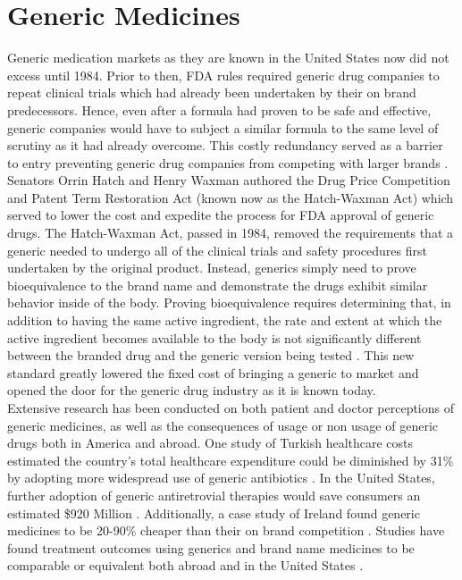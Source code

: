 \section{Generic Medicines}
Generic medication markets as they are known in the United States now did not excess until 1984. Prior to then, FDA rules required generic drug companies to repeat clinical trials which had already been undertaken by their on brand predecessors. Hence, even after a formula had proven to be safe and effective, generic companies would have to subject a similar formula to the same level of scrutiny as it had already overcome. This costly redundancy served as a barrier to entry preventing generic drug companies from competing with larger brands \cite{eban_bottle_2019}.\\
\indent Senators Orrin Hatch and Henry Waxman authored the Drug Price Competition and Patent Term Restoration Act (known now as the Hatch-Waxman Act) which served to lower the cost and expedite the process for FDA approval of generic drugs. The Hatch-Waxman Act, passed in 1984, removed the requirements that a generic needed to undergo all of the clinical trials and safety procedures first undertaken by the original product. Instead, generics simply need to prove bioequivalence to the brand name and demonstrate the drugs exhibit similar behavior inside of the body. Proving bioequivalence requires determining that, in addition to having the same active ingredient, the rate and extent at which the active ingredient becomes available to the body is not significantly different between the branded drug and the generic version being tested \cite{fda_primer}. This new standard greatly lowered the fixed cost of bringing a generic to market and opened the door for the generic drug industry as it is known today.\\
\indent Extensive research has been conducted on both patient and doctor perceptions of generic medicines, as well as the consequences of usage or non usage of generic drugs both in America and abroad. One study of Turkish healthcare costs estimated the country's total healthcare expenditure could be diminished by 31\% by adopting more widespread use of generic antibiotics \cite{mercanoglu_evaluation_2018}. In the United States, further adoption of generic antiretrovial therapies would save consumers an estimated \$920 Million \cite{walensky_economic_2013}. Additionally, a case study of Ireland found generic medicines to be 20-90\% cheaper than their on brand competition \cite{dunne_review_2013}. Studies have found treatment outcomes using generics and brand name medicines to be comparable or equivalent both abroad \cite{lin_comparative_2017} and in the United States \cite{desai_comparative_2019}.\\
